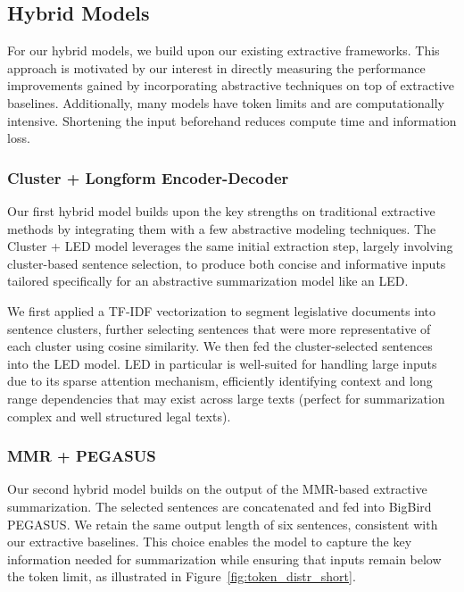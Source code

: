 \documentclass[11pt]{article}
\begin{document}
\subsection{Hybrid Models}

For our hybrid models, we build upon our existing extractive frameworks. This approach is motivated by our interest in directly measuring the performance improvements gained by incorporating abstractive techniques on top of extractive baselines. Additionally, many models have token limits and are computationally intensive. Shortening the input beforehand reduces compute time and information loss.

\subsubsection{Cluster + Longform Encoder-Decoder}

Our first hybrid model builds upon the key strengths on traditional extractive methods by integrating them with a few abstractive modeling techniques. The Cluster + LED model leverages the same initial extraction step, largely involving cluster-based sentence selection, to produce both concise and informative inputs tailored specifically for an abstractive summarization model like an LED.

We first applied a TF-IDF vectorization to segment legislative documents into sentence clusters, further selecting sentences that were more representative of each cluster using cosine similarity. We then fed the cluster-selected sentences into the LED model. LED in particular is well-suited for handling large inputs due to its sparse attention mechanism, efficiently identifying context and long range dependencies that may exist across large texts (perfect for summarization complex and well structured legal texts). 

\subsubsection{MMR + PEGASUS}

Our second hybrid model builds on the output of the MMR-based extractive summarization. The selected sentences are concatenated and fed into BigBird PEGASUS. We retain the same output length of six sentences, consistent with our extractive baselines. This choice enables the model to capture the key information needed for summarization while ensuring that inputs remain below the token limit, as illustrated in Figure~\ref{fig:token_distr_short}.
\end{document}
